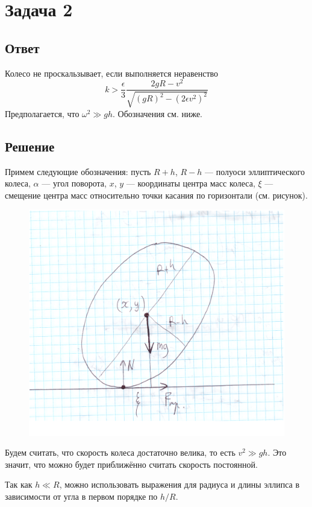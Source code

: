 \documentclass{article}
\begin{document}
	\section{Задача 2}
	\subsection{Ответ}
	Колесо не проскальзывает, если выполняется неравенство
	\begin{equation}
		k > \frac{\epsilon}{3} 
			\frac{2gR - v^2}{\sqrt{(gR)^2 - (2\epsilon v^2)^2}}
	\end{equation}
	Предполагается, что $\omega^2 \gg gh$.
	Обозначения см. ниже.
	\subsection{Решение}
	Примем следующие обозначения: пусть $R+h$, $R-h$ --- полуоси эллиптического колеса,
	$\alpha$ --- угол поворота, $x$, $y$ --- координаты центра масс колеса, $\xi$ --- смещение
	центра масс относительно точки касания по горизонтали (см. рисунок). 
	\begin{figure}[h]
		\includegraphics[width=\linewidth]{ellipsis.png}
	\end{figure}
	Будем считать, что скорость колеса достаточно велика, то есть $v^2 \gg gh$. Это значит,
	что можно будет приближённо считать скорость постоянной.

	Так как $h \ll R$, можно использовать выражения для радиуса и длины эллипса в зависимости
	от угла в первом порядке по $h/R$.
	
\end{document}
